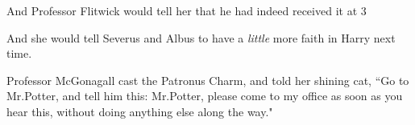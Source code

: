 And Professor Flitwick would tell her that he had indeed received it at 3\pm

And she would tell Severus and Albus to have a \emph{little} more faith in Harry next time.

Professor McGonagall cast the Patronus Charm, and told her shining cat, ``Go to Mr.\?Potter, and tell him this: Mr.\?Potter, please come to my office as soon as you hear this, without doing anything else along the way."

